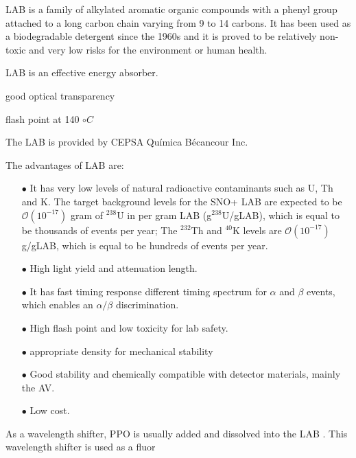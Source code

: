 LAB is a family of alkylated aromatic organic compounds with a phenyl group attached to a long carbon chain varying from 9 to 14 carbons\cite{wiki_LAB, scintillatorPaper}. It has been used as a biodegradable detergent since the 1960s and it is proved to be relatively non-toxic and very low risks for the environment or human health\cite{wiki_LAB}.





LAB is an effective energy absorber.

 good optical transparency 



 flash point at 140 $\circ C$




The LAB is provided by CEPSA Qu\'{i}mica B\'ecancour Inc.

The advantages of LAB are:
\begin{itemize}
	\item[$\bullet$] It has very low levels of natural radioactive contaminants such as U, Th and K.
	The target background levels for the SNO+ LAB are expected to be $\mathcal O(10^{-17})$ gram of $^{238}$U in per gram LAB (g$^{238}$U/gLAB), which is equal to be thousands of events per year;
	The $^{232}$Th and $^{40}$K levels are $\mathcal O(10^{-17})$ g/gLAB, which is equal to be hundreds of events per year\cite{markchen_bkg}.
	
	\item[$\bullet$] High light yield and attenuation length.
	\item[$\bullet$] It has fast timing response different timing spectrum for $\alpha$ and $\beta$ events, which enables an $\alpha/\beta$ discrimination. 
	\item[$\bullet$] High flash point and low toxicity for lab safety.
	\item[$\bullet$] appropriate density for mechanical stability
	\item[$\bullet$] Good stability and chemically compatible with detector materials, mainly the AV.
	\item[$\bullet$] Low cost.
\end{itemize}

As a wavelength shifter, PPO is usually added and dissolved into the LAB \cite{wunderly1990new}. This wavelength shifter is used as a fluor

